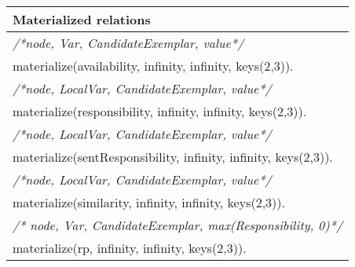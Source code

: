\documentclass[letterpaper,twocolumn,11pt]{article}
\begin{document}
\begin{tabular}{|l|}
\hline
\rowcolor{myblue} Materialized relations \\
\hline
\scriptsize{\textit{/*node, Var, CandidateExemplar, value*/}} \\
\scriptsize{materialize(availability, infinity, infinity, keys(2,3)).} \\

\scriptsize{\textit{/*node, LocalVar, CandidateExemplar, value*/}} \\
\scriptsize{materialize(responsibility, infinity, infinity, keys(2,3)).} \\

\scriptsize{\textit{/*node, LocalVar, CandidateExemplar, value*/}} \\
\scriptsize{materialize(sentResponsibility, infinity, infinity, keys(2,3)).} \\

\scriptsize{\textit{/*node, LocalVar, CandidateExemplar, value*/}}\\
\scriptsize{materialize(similarity, infinity, infinity, keys(2,3)).} \\

\scriptsize{\textit{/* node, Var, CandidateExemplar, max(Responsibility, 0)*/}} \\
\scriptsize{materialize(rp, infinity, infinity, keys(2,3)).} \\
\hline
\end{tabular}
\end{document}
